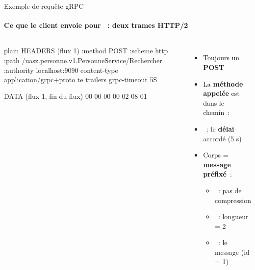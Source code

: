 \documentclass[aspectratio=169,11pt]{beamer}
\begin{document}
\begin{frame}[fragile]{Exemple de requête gRPC}
  \framesubtitle{Ce que le client envoie pour ~: deux trames HTTP/2}
  \begin{columns}[T,onlytextwidth]
\begin{codetiny}{plain}
HEADERS  (flux 1)
  :method       POST
  :scheme       http
  :path         /uasz.personne.v1.PersonneService/Rechercher
  :authority    localhost:9090
  content-type  application/grpc+proto
  te            trailers
  grpc-timeout  5S

DATA  (flux 1, fin du flux)
  00  00 00 00 02  08 01
\end{codetiny}
    \small
    \begin{itemize}
      \item Toujours un \textbf{POST}
      \item La \textbf{méthode appelée} est dans le chemin~: 
      \item {}~: le \textbf{délai} accordé (5 s)
      \item Corps = \textbf{message préfixé}~:
      \begin{itemize}
        \item {}~: pas de compression
        \item {}~: longueur = 2
        \item {}~: le message (id = 1)
      \end{itemize}
    \end{itemize}
  \end{columns}
\end{frame}
\end{document}

